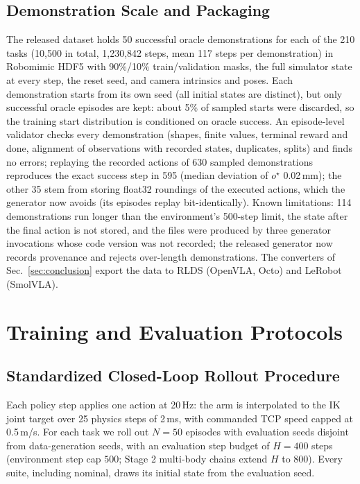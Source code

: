 \documentclass[conference]{IEEEtran}
\begin{document}
\subsection{Demonstration Scale and Packaging}
The released dataset holds 50 successful oracle demonstrations for each of the 210 tasks (10{,}500 in total, 1{,}230{,}842 steps, mean 117 steps per demonstration) in Robomimic HDF5 with 90\%/10\% train/validation masks, the full simulator state at every step, the reset seed, and camera intrinsics and poses. Each demonstration starts from its own seed (all initial states are distinct), but only successful oracle episodes are kept: about 5\% of sampled starts were discarded, so the training start distribution is conditioned on oracle success. An episode-level validator checks every demonstration (shapes, finite values, terminal reward and done, alignment of observations with recorded states, duplicates, splits) and finds no errors; replaying the recorded actions of 630 sampled demonstrations reproduces the exact success step in 595 (median deviation of $o^\star$ 0.02\,mm); the other 35 stem from storing float32 roundings of the executed actions, which the generator now avoids (its episodes replay bit-identically). Known limitations: 114 demonstrations run longer than the environment's 500-step limit, the state after the final action is not stored, and the files were produced by three generator invocations whose code version was not recorded; the released generator now records provenance and rejects over-length demonstrations. The converters of Sec.~\ref{sec:conclusion} export the data to RLDS (OpenVLA, Octo) and LeRobot (SmolVLA).

\section{Training and Evaluation Protocols}
\label{sec:protocols}

\subsection{Standardized Closed-Loop Rollout Procedure}
Each policy step applies one action at 20\,Hz: the arm is interpolated to the IK joint target over 25 physics steps of 2\,ms, with commanded TCP speed capped at 0.5\,m/s. For each task we roll out $N=50$ episodes with evaluation seeds disjoint from data-generation seeds, with an evaluation step budget of $H=400$ steps (environment step cap $500$; Stage 2 multi-body chains extend $H$ to $800$). Every suite, including nominal, draws its initial state from the evaluation seed.
\end{document}
